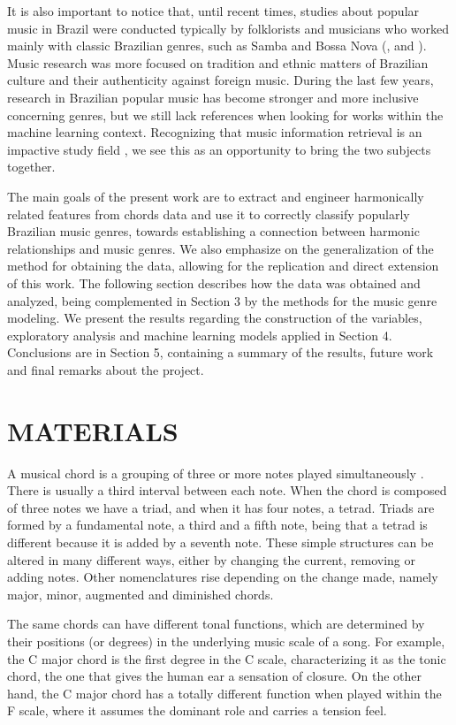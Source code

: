 \documentclass[twocolumn]{article}
\begin{document}
It is also important to notice that, until recent times,
studies about popular music in Brazil were
conducted typically by folklorists and musicians
who 
worked mainly with classic Brazilian 
genres, such as Samba and Bossa Nova 
(\cite{Vianna1999}, \cite{Behague1980} and
\cite{McCann2007}). Music research was more 
focused on tradition and ethnic matters of Brazilian culture and their authenticity against foreign music. 
During the last few years, 
research in Brazilian popular music 
has become stronger and more inclusive concerning 
genres, but
we still lack references when looking for 
works within the machine learning context. 
Recognizing that music information retrieval 
is an impactive study field \cite{Muller2007},
we see this as an opportunity to bring the
two subjects together. 

The main goals of the present work are
to extract and engineer harmonically related
features from chords data and use it
to correctly classify popularly
Brazilian music genres, towards
establishing a connection between harmonic
relationships and music genres.
We also emphasize on the generalization 
of the method for obtaining the data, allowing
for the replication and direct extension
of this work. The
following section describes how the data 
was obtained and analyzed, being complemented
in Section 3 by the methods for the music genre
modeling. We present the results 
regarding the construction of the variables,
exploratory analysis and machine learning
models applied in Section 4. Conclusions 
are in Section 5, containing a
summary of the results, future work and 
final remarks about the project. 

\section{MATERIALS}\label{sec:page_size}

A musical chord is a grouping of three or more notes
played simultaneously \cite{Almada2012}. There is usually 
a third interval between each note. When the chord
is composed of three notes we have a triad, 
and when it has four notes, a tetrad. 
Triads are formed by a fundamental note, a third and a fifth note, being that a tetrad is different
because it is added by a seventh note. 
These simple structures can be altered in many different ways, either by changing the current,
removing or adding notes. Other nomenclatures
rise depending on the change made, namely major, minor, augmented and diminished chords. 

The same chords can have different tonal functions, 
which are determined by their positions (or degrees) in the 
underlying music scale of a song. For example, the C major chord
is the first degree in the C scale, characterizing it
as the tonic chord, the one that gives the human ear a 
sensation of closure. On the other hand, the C major 
chord has a totally different function when played within
the F scale, where it assumes the dominant role and 
carries a tension feel. 
\end{document}
